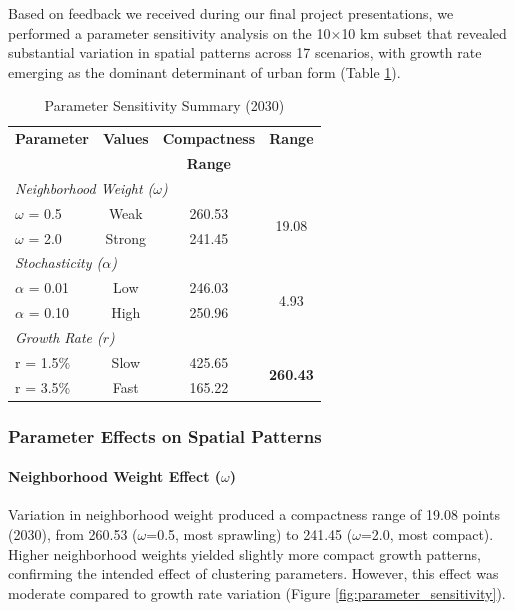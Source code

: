 \documentclass[12pt,a4paper]{article}
\begin{document}
Based on feedback we received during our final project presentations, we performed a parameter sensitivity analysis on the 10$\times$10 km subset that revealed substantial variation in spatial patterns across 17 scenarios, with growth rate emerging as the dominant determinant of urban form (Table \ref{tab:scenario_metrics_summary}).
\begin{table}[H]
\caption{Parameter Sensitivity Summary (2030)}
\label{tab:scenario_metrics_summary}
\centering
\small
\renewcommand{\arraystretch}{1.2}
\begin{tabular}{lccc}
\toprule
\textbf{Parameter} & \textbf{Values} & \textbf{Compactness} & \textbf{Range} \\
 & & \textbf{Range} & \\
\midrule
\multicolumn{4}{l}{\textit{Neighborhood Weight ($\omega$)}} \\
\quad $\omega$ = 0.5 & Weak & 260.53 & \multirow{2}{*}{19.08} \\
\quad $\omega$ = 2.0 & Strong & 241.45 & \\
\midrule
\multicolumn{4}{l}{\textit{Stochasticity ($\alpha$)}} \\
\quad $\alpha$ = 0.01 & Low & 246.03 & \multirow{2}{*}{4.93} \\
\quad $\alpha$ = 0.10 & High & 250.96 & \\
\midrule
\multicolumn{4}{l}{\textit{Growth Rate ($r$)}} \\
\quad r = 1.5\% & Slow & 425.65 & \multirow{2}{*}{\textbf{260.43}} \\
\quad r = 3.5\% & Fast & 165.22 & \\
\bottomrule
\end{tabular}
\end{table}
\subsubsection{Parameter Effects on Spatial Patterns}

\paragraph{Neighborhood Weight Effect ($\omega$)}
Variation in neighborhood weight produced a compactness range of 19.08 points (2030), from 260.53 ($\omega$=0.5, most sprawling) to 241.45 ($\omega$=2.0, most compact). Higher neighborhood weights yielded slightly more compact growth patterns, confirming the intended effect of clustering parameters. However, this effect was moderate compared to growth rate variation (Figure \ref{fig:parameter_sensitivity}).
\end{document}

